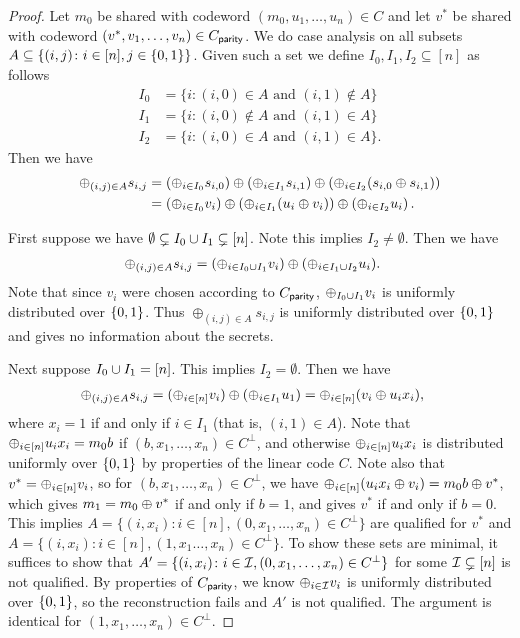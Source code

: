 \begin{proof}
	Let $m_0$ be shared with codeword $(m_0, u_1,\dotsc, u_n) \in C$ and let $v^*$ be shared with codeword $(v^*, v_1,\dotsc,v_n) \in C_\mathsf{parity}$.
	We do case analysis on all subsets $A \subseteq \{ (i,j) \colon i \in [n], j \in {\{0,1\}} \}$.
	Given such a set we define $I_0, I_1, I_2 \subseteq [n]$ as follows
	\begin{align*}
		I_0 &= \{ i \colon (i,0) \in A \text{ and } (i,1)\not\in A\}\\
		I_1 &= \{ i \colon (i,0) \not\in A \text{ and } (i,1)\in A\}\\
		I_2 &= \{ i \colon (i,0) \in A \text{ and } (i,1)\in A\}.
	\end{align*}
	Then we have
	\begin{align*}
		\oplus_{(i,j) \in A} s_{i,j} &= \left(\oplus_{i \in I_0} s_{i,0}\right) \oplus \left( \oplus_{i \in I_1} s_{i,1} \right) \oplus \left( \oplus_{i \in I_2}(s_{i,0} \oplus s_{i,1}) \right)\\
		&= \left( \oplus_{i \in I_0} v_i \right) \oplus \left( \oplus_{i \in I_1} (u_i \oplus v_i) \right) \oplus \left(\oplus_{i \in I_2} u_i\right).
	\end{align*}
	
	First suppose we have $\emptyset \subsetneq I_0 \cup I_1 \subsetneq [n]$.
	Note this implies $I_2 \neq \emptyset$.
	Then we have
	\begin{align*}
		\oplus_{(i,j) \in A} s_{i,j} &= (\oplus_{i \in I_0\cup I_1} v_i) \oplus (\oplus_{i \in I_1 \cup I_2} u_i).
	\end{align*}
	Note that since $v_i$ were chosen according to $C_\mathsf{parity}$, $\oplus_{I_0 \cup I_1} v_i$ is uniformly distributed over ${\{0,1\}}$. 
	Thus $\oplus_{(i,j) \in A} s_{i,j}$ is uniformly distributed over ${\{0,1\}}$ and gives no information about the secrets.
	
	Next suppose $I_0 \cup I_1 = [n]$. 
	This implies $I_2 = \emptyset$.
	Then we have
	\begin{align*}
		\oplus_{(i,j)\in A} s_{i,j} &= (\oplus_{i \in [n]} v_i) \oplus (\oplus_{i \in I_1} u_1) = \oplus_{i \in [n]} (v_i \oplus u_ix_i),
	\end{align*}
	where $x_i = 1$ if and only if $i \in I_1$ (that is, $(i,1) \in A$).
	Note that $\oplus_{i \in [n]} u_i x_i = m_0b$ if $(b, x_1,\dotsc, x_n) \in C^\perp$, and otherwise $\oplus_{i\in [n]} u_ix_i$ is distributed uniformly over ${\{0,1\}}$ by properties of the linear code $C$.
	Note also that $v^* = \oplus_{i \in [n]} v_i$, so for $(b, x_1,\dotsc, x_n) \in C^\perp$, we have $\oplus_{i \in [n]} (u_ix_i \oplus v_i) = m_0b \oplus v^*$, which gives $m_1 = m_0 \oplus v^*$ if and only if $b = 1$, and gives $v^*$ if and only if $b = 0$.
	This implies $A = \{ (i, x_i)\colon i \in [n], (0,x_1,\dotsc, x_n) \in C^\perp \}$
	are qualified for $v^*$ and $A = \{ (i,x_i) \colon i\in[n], (1,x_1\dotsc,x_n) \in C^\perp \}$.
	To show these sets are minimal, it suffices to show that $A' = \{ (i, x_i) \colon i \in {\mathcal I},  (0,x_1,\dotsc, x_n) \in C^\perp\}$ for some ${\mathcal I} \subsetneq [n]$ is not qualified.
	By properties of $C_\mathsf{parity}$, we know $\oplus_{i \in {\mathcal I}} v_i$ is uniformly distributed over ${\{0,1\}}$, so the reconstruction fails and $A'$ is not qualified.
	The argument is identical for $(1,x_1,\dotsc, x_n) \in C^\perp$.
	

\end{proof}
